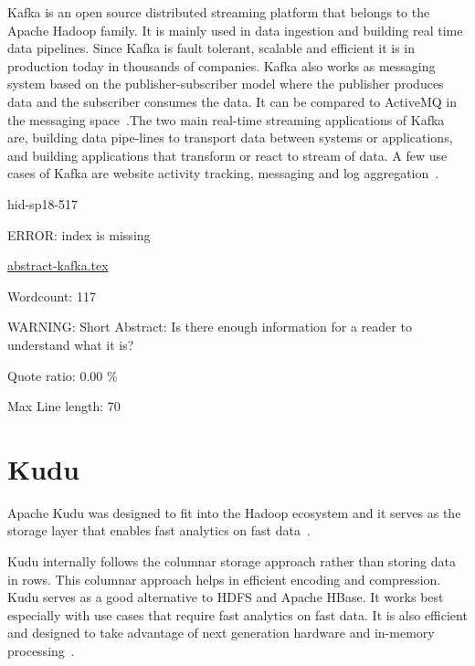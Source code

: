 Kafka is an open source distributed streaming platform that belongs 
to the Apache Hadoop family. It is mainly used in data ingestion and 
building real time data pipelines. Since Kafka is fault tolerant, 
scalable and efficient it is in production today in thousands of 
companies. Kafka also works as messaging system based on the 
publisher-subscriber model where the publisher produces data and 
the subscriber consumes the data. It can be compared to ActiveMQ 
in the messaging space~\cite{hid-sp18-517-ApacheKafka}.The two main
real-time streaming applications of Kafka are, building  data
pipe-lines to transport data between systems or applications, and
building applications that transform or react to stream of data. A few
use cases of Kafka are website activity tracking, messaging 
and log aggregation~\cite{hid-sp18-517-ApacheKafka}.



\begin{IU}

hid-sp18-517

ERROR: index is missing

\href{https://github.com/cloudmesh-community/hid-sp18-517/blob/master//technology/abstract-kafka.tex}{abstract-kafka.tex}

 

Wordcount: 117

WARNING: Short Abstract: Is there enough information for a reader to understand what it is?


Quote ratio: 0.00 \%
 
Max Line length: 70
\end{IU}

\section{Kudu}

Apache Kudu was designed to fit into the Hadoop ecosystem and it 
serves as the storage layer that enables fast analytics on fast 
data~\cite{hid-sp18-517-ApacheKudu}.

Kudu internally follows the columnar storage approach rather than 
storing data in rows. This columnar approach helps in efficient 
encoding and compression. Kudu serves as a good alternative to HDFS 
and Apache HBase. It works best especially with use cases that 
require fast analytics on fast data. It is also efficient and 
designed to take advantage of next generation hardware and 
in-memory processing~\cite{hid-sp18-517-ApacheKudu}.





